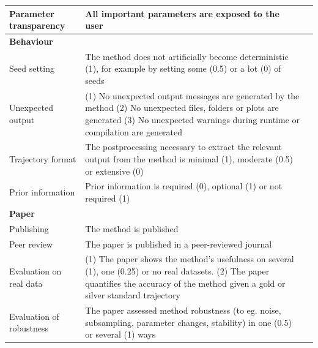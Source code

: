 \begin{table}[tbh!]
\begin{tabular}{p{3.5cm}p{9cm}p{2.5cm}}
		Parameter transparency & All important parameters are exposed to the user & \cite{taschuk_tensimplerules_2017}\\
		
		\midrule
		\multicolumn{3}{l}{\textbf{Behaviour}} \\*
		
		Seed setting & The method does not artificially become deterministic (1), for example by setting some (0.5) or a lot (0) of seeds & \cite{puget_greendiceare_2016}\\*
		
		Unexpected output & (1) No unexpected output messages are generated by the method (2) No unexpected files, folders or plots are generated (3) No unexpected warnings during runtime or compilation are generated & \cite{artaza_top10metrics_2016}\\*
		
		Trajectory format & The postprocessing necessary to extract the relevant output from the method is minimal (1), moderate (0.5) or extensive (0) & \\*
		
		Prior information & Prior information is required (0), optional (1) or not required (1) & \\*
		
		\midrule
		\multicolumn{3}{l}{\textbf{Paper}} \\*
		
		Publishing & The method is published & \\*
		
		Peer review & The paper is published in a peer-reviewed journal & \cite{karimzadeh_topconsiderationscreating_2018,gannon_essentialrolepeer_2001,baldwin_refereeswetrust_2017}\\*
		
		Evaluation on real data & (1) The paper shows the method's usefulness on several (1), one (0.25) or no real datasets. (2) The paper quantifies the accuracy of the method given a gold or silver standard trajectory & \cite{aniba_issuesbioinformaticsbenchmarking_2010,jelizarow_overoptimismbioinformaticsillustration_2010}\\*
		
		Evaluation of robustness & The paper assessed method robustness (to eg. noise, subsampling, parameter changes, stability) in one (0.5) or several (1) ways & \cite{karimzadeh_topconsiderationscreating_2018,aniba_issuesbioinformaticsbenchmarking_2010,boulesteix_tensimplerules_2015,jelizarow_overoptimismbioinformaticsillustration_2010}\\
		
		\bottomrule
	\end{tabular}
	\endgroup{}
\end{table}


